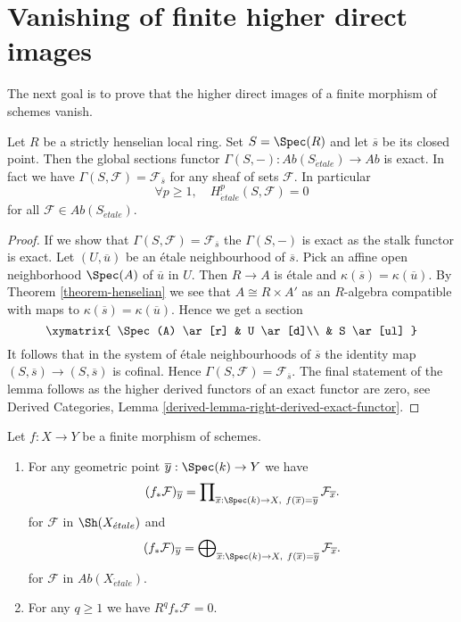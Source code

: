 \section{Vanishing of finite higher direct images}
\label{section-vanishing-finite-morphism}

\noindent
The next goal is to prove that the higher direct images of a finite morphism of
schemes vanish.

\begin{lemma}
\label{lemma-vanishing-etale-cohomology-strictly-henselian}
Let $R$ be a strictly henselian local ring. Set $S = \Spec(R)$ and let
$\overline{s}$ be its closed point. Then the global
sections functor
$\Gamma(S, -) : \textit{Ab}(S_{\acute{e}tale}) \to \textit{Ab}$
is exact. In fact we have $\Gamma(S, \mathcal{F}) = \mathcal{F}_{\overline{s}}$
for any sheaf of sets $\mathcal{F}$. In particular
$$
\forall p\geq 1, \quad H_{\acute{e}tale}^p(S, \mathcal{F})=0
$$
for all $\mathcal{F}\in \textit{Ab}(S_{\acute{e}tale})$.
\end{lemma}

\begin{proof}
If we show that $\Gamma(S, \mathcal{F}) = \mathcal{F}_{\overline{s}}$
the $\Gamma(S, -)$ is exact as the stalk functor is exact.
Let $(U, \overline{u})$ be an \'etale neighbourhood of $\overline{s}$.
Pick an affine open neighborhood $\Spec(A)$ of $\overline{u}$ in $U$.
Then $R \to A$ is \'etale and $\kappa(\overline{s}) = \kappa(\overline{u})$.
By Theorem \ref{theorem-henselian} we see that $A \cong R \times A'$
as an $R$-algebra compatible with maps to
$\kappa(\overline{s}) = \kappa(\overline{u})$.
Hence we get a section
$$
\xymatrix{
\Spec(A) \ar[r] & U \ar[d]\\
& S \ar[ul]
}
$$
It follows that in the system of \'etale neighbourhoods of $\overline{s}$
the identity map $(S, \overline{s}) \to (S, \overline{s})$ is cofinal.
Hence $\Gamma(S, \mathcal{F}) = \mathcal{F}_{\overline{s}}$.
The final statement of the lemma follows as the higher derived
functors of an exact functor are zero, see
Derived Categories, Lemma \ref{derived-lemma-right-derived-exact-functor}.
\end{proof}

\begin{proposition}
\label{proposition-finite-higher-direct-image-zero}
Let $f : X \to Y$ be a finite morphism of schemes.
\begin{enumerate}
\item For any geometric point $\overline{y} : \Spec(k) \to Y$ we have
$$
(f_*\mathcal{F})_{\overline{y}} =
\prod\nolimits_{\overline{x} : \Spec(k) \to X,\ f(\overline{x}) =
\overline{y}} \mathcal{F}_{\overline{x}}.
$$
for $\mathcal{F}$ in $\Sh(X_{\acute{e}tale})$ and
$$
(f_*\mathcal{F})_{\overline{y}} =
\bigoplus\nolimits_{\overline{x} : \Spec(k) \to X,\ f(\overline{x}) =
\overline{y}} \mathcal{F}_{\overline{x}}.
$$
for $\mathcal{F}$ in $\textit{Ab}(X_{\acute{e}tale})$.
\item For any $q \geq 1$ we have $R^q f_*\mathcal{F} = 0$.
\end{enumerate}
\end{proposition}

